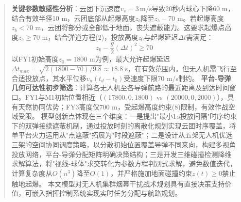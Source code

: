 \documentclass{JXUSTmodeling}
\begin{document}
\begin{abstract}
\textbf{关键参数敏感性分析}：云团下沉速度$v_s=3\,\text{m/s}$导致20秒内球心下降60 m，结合有效半径10 m，云团底部从起爆高度$z_b$降至$z_b-70$ m。若起爆高度$z_b<70$ m，云团将部分或全部低于地面，丧失遮蔽能力。这要求起爆点高度$z_b\geq 70$ m，结合弹道方程(2)，投放高度$z_0$与起爆延迟$\Delta t$需满足：
\begin{equation}
z_0 - \frac{g}{2}(\Delta t)^2 \geq 70 \tag{8}
\end{equation}
以FY1初始高度$z_0=1800$ m为例，最大允许起爆延迟$\Delta t_{max}=\sqrt{2(1800-70)/9.8}\approx 18.8$ s，在有效范围内。但无人机需飞行至合适投放点，其水平位移$v_u(t_d-t_0)$受速度下限70 m/s制约。
\textbf{平台-导弹几何可达性初步筛选}：计算各无人机至各导弹航路的最近距离及到达时间窗口。FY1与M1初始位置相近（$(17800,0,1800)$ vs $(20000,0,2000)$），具有天然协同优势；FY3高度仅700 m，受起爆高度约束(8)限制，有效作战空域受限。
模型创新点体现在三个维度：一是提出"最小$1\,\text{s}$投放间隔"时序约束下的双弹接续遮蔽机制，通过投放时刻的离散化规划实现云团时序覆盖，将单平台火力运用从"点遮蔽"拓展为"时段遮蔽"；二是设计从五架无人机优选三架的空间协同调度策略，以分散初始位置覆盖导弹不同来向，构建多视角投放网络，平台-导弹分配矩阵明确决策结构；三是开发三维碰撞检测降维求解算法，将"视线-球体"求交转化为参数方程判别式求解，避免数值迭代，计算复杂度从$O(n^3)$降至$O(1)$，并严格施加地面碰撞约束$z(t)\geq 0$禁止触地起爆。
本文模型对无人机集群烟幕干扰战术规划具有直接决策支持价值，可嵌入指挥控制系统实现实时任务分配与航路规划。
\end{abstract}
\end{document}
